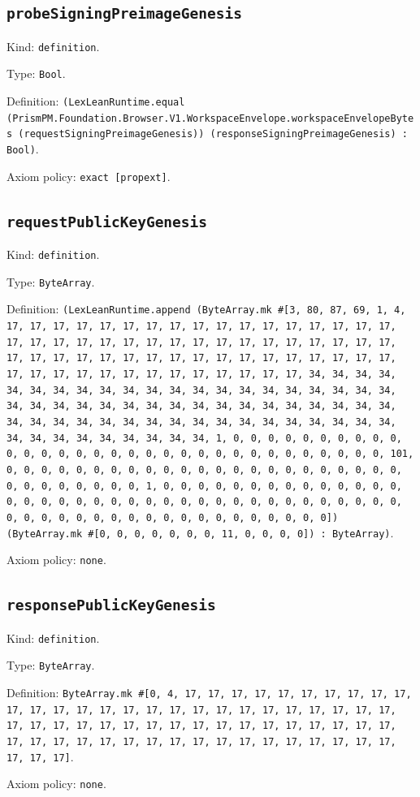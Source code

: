 \documentclass[11pt]{article}
\begin{document}
\subsection*{\texttt{probeSigningPreimageGenesis}}
\noindent Kind: \texttt{definition}.\par
\noindent Type: \texttt{Bool}.\par
\noindent Definition: \texttt{(LexLeanRuntime.equal (PrismPM.Foundation.Browser.V1.WorkspaceEnvelope.workspaceEnvelopeBytes (requestSigningPreimageGenesis)) (responseSigningPreimageGenesis) : Bool)}.\par
\noindent Axiom policy: \texttt{exact [propext]}.\par
\subsection*{\texttt{requestPublicKeyGenesis}}
\noindent Kind: \texttt{definition}.\par
\noindent Type: \texttt{ByteArray}.\par
\noindent Definition: \texttt{(LexLeanRuntime.append (ByteArray.mk \#[3, 80, 87, 69, 1, 4, 17, 17, 17, 17, 17, 17, 17, 17, 17, 17, 17, 17, 17, 17, 17, 17, 17, 17, 17, 17, 17, 17, 17, 17, 17, 17, 17, 17, 17, 17, 17, 17, 17, 17, 17, 17, 17, 17, 17, 17, 17, 17, 17, 17, 17, 17, 17, 17, 17, 17, 17, 17, 17, 17, 17, 17, 17, 17, 17, 17, 17, 17, 17, 17, 34, 34, 34, 34, 34, 34, 34, 34, 34, 34, 34, 34, 34, 34, 34, 34, 34, 34, 34, 34, 34, 34, 34, 34, 34, 34, 34, 34, 34, 34, 34, 34, 34, 34, 34, 34, 34, 34, 34, 34, 34, 34, 34, 34, 34, 34, 34, 34, 34, 34, 34, 34, 34, 34, 34, 34, 34, 34, 34, 34, 34, 34, 34, 34, 1, 0, 0, 0, 0, 0, 0, 0, 0, 0, 0, 0, 0, 0, 0, 0, 0, 0, 0, 0, 0, 0, 0, 0, 0, 0, 0, 0, 0, 0, 0, 0, 0, 101, 0, 0, 0, 0, 0, 0, 0, 0, 0, 0, 0, 0, 0, 0, 0, 0, 0, 0, 0, 0, 0, 0, 0, 0, 0, 0, 0, 0, 0, 0, 0, 1, 0, 0, 0, 0, 0, 0, 0, 0, 0, 0, 0, 0, 0, 0, 0, 0, 0, 0, 0, 0, 0, 0, 0, 0, 0, 0, 0, 0, 0, 0, 0, 0, 0, 0, 0, 0, 0, 0, 0, 0, 0, 0, 0, 0, 0, 0, 0, 0, 0, 0, 0, 0, 0, 0, 0, 0]) (ByteArray.mk \#[0, 0, 0, 0, 0, 0, 0, 11, 0, 0, 0, 0]) : ByteArray)}.\par
\noindent Axiom policy: \texttt{none}.\par
\subsection*{\texttt{responsePublicKeyGenesis}}
\noindent Kind: \texttt{definition}.\par
\noindent Type: \texttt{ByteArray}.\par
\noindent Definition: \texttt{ByteArray.mk \#[0, 4, 17, 17, 17, 17, 17, 17, 17, 17, 17, 17, 17, 17, 17, 17, 17, 17, 17, 17, 17, 17, 17, 17, 17, 17, 17, 17, 17, 17, 17, 17, 17, 17, 17, 17, 17, 17, 17, 17, 17, 17, 17, 17, 17, 17, 17, 17, 17, 17, 17, 17, 17, 17, 17, 17, 17, 17, 17, 17, 17, 17, 17, 17, 17, 17]}.\par
\noindent Axiom policy: \texttt{none}.\par
\end{document}
